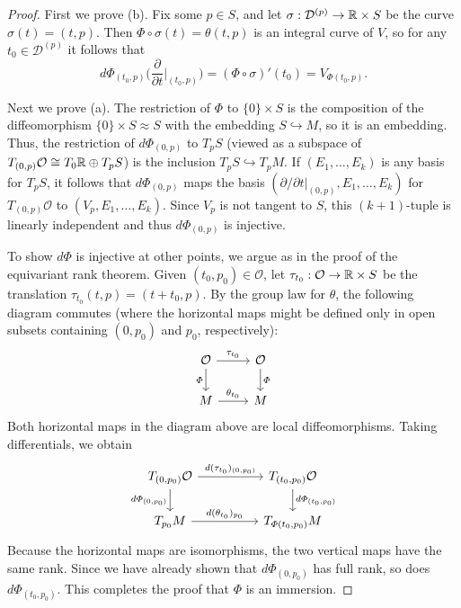 \begin{proof}
First we prove (b). Fix some $p\in S$, and let $\sigma:\mathcal{D}^{(p)}\to\mathbb{R}\times S$ be the curve $\sigma(t)=(t,p)$. Then $\varPhi\circ\sigma(t)=\theta(t,p)$ is an integral curve of $V$, so for any $t_0\in\mathcal{D}^{(p)}$ it follows that
\[d\varPhi_{(t_0,p)}\Big(\frac{\partial}{\partial t}\Big|_{(t_0,p)}\Big)=(\varPhi\circ\sigma)'(t_0)=V_{\varPhi(t_0,p)}.\]

Next we prove (a). The restriction of $\varPhi$ to $\{0\}\times S$ is the composition of the diffeomorphism $\{0\}\times S\approx S$ with the embedding $S\hookrightarrow M$, so it is an embedding. Thus, the restriction of $d\varPhi_{(0,p)}$ to $T_pS$ (viewed as a subspace of $T_{(0,p)}\mathcal{O}\cong T_0\mathbb{R}\oplus T_pS$) is the inclusion $T_pS\hookrightarrow T_pM$. If $(E_1,\dots,E_k)$ is any basis for $T_pS$, it follows that $d\varPhi_{(0,p)}$ maps the basis $(\partial/\partial t|_{(0,p)},E_1,\dots,E_k)$ for $T_{(0,p)}\mathcal{O}$ to $(V_p,E_1,\dots,E_k)$. Since $V_p$ is not tangent to $S$, this $(k+1)$-tuple is linearly independent and thus $d\varPhi_{(0,p)}$ is injective.\par
To show $d\varPhi$ is injective at other points, we argue as in the proof of the equivariant rank theorem. Given $(t_0,p_0)\in\mathcal{O}$, let $\tau_{t_0}:\mathcal{O}\to\mathbb{R}\times S$ be the translation $\tau_{t_0}(t,p)=(t+t_0,p)$. By the group law for $\theta$, the following diagram commutes (where the horizontal maps might be defined only in open subsets containing $(0,p_0)$ and $p_0$, respectively):
\[\begin{tikzcd}
\mathcal{O}\ar[r,"\tau_{t_0}"]\ar[d,swap,"\varPhi"]&\mathcal{O}\ar[d,"\varPhi"]\\
M\ar[r,"\theta_{t_0}"]&M
\end{tikzcd}\]
Both horizontal maps in the diagram above are local diffeomorphisms. Taking differentials, we obtain
\[\begin{tikzcd}
T_{(0,p_0)}\mathcal{O}\ar[rr,"d(\tau_{t_0})_{(0,p_0)}"]\ar[d,swap,"d\varPhi_{(0,p_0)}"]&&T_{(t_0,p_0)}\mathcal{O}\ar[d,"d\varPhi_{(t_0,p_0)}"]\\
T_{p_0}M\ar[rr,"d(\theta_{t_0})_{p_0}"]&&T_{\varPhi(t_0,p_0)}M
\end{tikzcd}\]
Because the horizontal maps are isomorphisms, the two vertical maps have the same
rank. Since we have already shown that $d\varPhi_{(0,p_0)}$ has full rank, so does $d\varPhi_{(t_0,p_0)}$. This completes the proof that $\varPhi$ is an immersion.\par

\end{proof}
